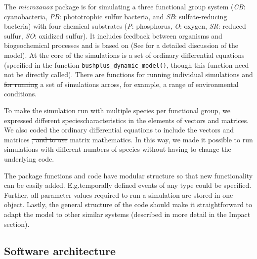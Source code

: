 \documentclass[]{elsarticle} %
\providecommand{\DIFaddtex}[1]{{\protect\color{blue}\uwave{#1}}} %
\providecommand{\DIFdeltex}[1]{{\protect\color{red}\sout{#1}}}                      %
\providecommand{\DIFaddbegin}{} %
\providecommand{\DIFaddend}{} %
\providecommand{\DIFdelbegin}{} %
\providecommand{\DIFdelend}{} %
\providecommand{\DIFadd}[1]{\texorpdfstring{\DIFaddtex{#1}}{#1}} %
\providecommand{\DIFdel}[1]{\texorpdfstring{\DIFdeltex{#1}}{}} %
\newcommand{\DIFscaledelfig}{0.5}
\newlength{\DIFdelgraphicswidth} %
\newlength{\DIFdelgraphicsheight} %
\newcommand{\DIFaddincludegraphics}[2][]{{\color{blue}\fbox{\DIFOincludegraphics[#1]{#2}}}} %
\newcommand{\DIFdelincludegraphics}[2][]{%
\sbox{\DIFdelgraphicsbox}{\DIFOincludegraphics[#1]{#2}}%
\settoboxwidth{\DIFdelgraphicswidth}{\DIFdelgraphicsbox} %
\settoboxtotalheight{\DIFdelgraphicsheight}{\DIFdelgraphicsbox} %
\scalebox{\DIFscaledelfig}{%
\parbox[b]{\DIFdelgraphicswidth}{\usebox{\DIFdelgraphicsbox}\\[-\baselineskip] \rule{\DIFdelgraphicswidth}{0em}}\llap{\resizebox{\DIFdelgraphicswidth}{\DIFdelgraphicsheight}{%
\setlength{\unitlength}{\DIFdelgraphicswidth}%
\begin{picture}(1,1)%
\thicklines\linethickness{2pt} %
{\color[rgb]{1,0,0}\put(0,0){\framebox(1,1){}}}%
{\color[rgb]{1,0,0}\put(0,0){\line( 1,1){1}}}%
{\color[rgb]{1,0,0}\put(0,1){\line(1,-1){1}}}%
\end{picture}%
}\hspace*{3pt}}} %
} %
\DeclareRobustCommand{\DIFaddbegin}{\DIFOaddbegin \let\includegraphics\DIFaddincludegraphics} %
\DeclareRobustCommand{\DIFaddend}{\DIFOaddend \let\includegraphics\DIFOincludegraphics} %
\DeclareRobustCommand{\DIFdelbegin}{\DIFOdelbegin \let\includegraphics\DIFdelincludegraphics} %
\DeclareRobustCommand{\DIFdelend}{\DIFOaddend \let\includegraphics\DIFOincludegraphics} %
\begin{document}
The \emph{microxanox} package is for simulating a three functional group system (\emph{CB}: cyanobacteria, \emph{PB}: phototrophic sulfur bacteria, and \emph{SB}: sulfate-reducing bacteria) with four chemical substrates (\emph{P}: phosphorus, \emph{O}: oxygen, \emph{SR}: reduced sulfur, \emph{SO}: oxidized sulfur). It includes feedback between organisms and biogeochemical processes and is based on \citet{Bush2017} (See \citet{Bush2017} for a detailed discussion of the model). At the core of the simulations is a set of ordinary differential equations (specified in the function \texttt{bushplus\_dynamic\_model()}, though this function need not be directly called). There are functions for running individual simulations and \DIFdelbegin \DIFdel{for running }\DIFdelend a set of simulations across, for example, a range of environmental conditions.

To make the simulation run with multiple species per functional group, we expressed different species\DIFaddbegin \DIFadd{' }\DIFaddend characteristics in the elements of vectors and matrices. We also coded the ordinary differential equations to include the vectors and matrices \DIFdelbegin \DIFdel{, and to use }\DIFdelend \DIFaddbegin \DIFadd{and used }\DIFaddend matrix mathematics. In this way, we made it possible to run simulations with different numbers of species without having to change the underlying code.

The package functions and code have \DIFaddbegin \DIFadd{a }\DIFaddend modular structure so that new functionality can be easily added. E.g.\DIFaddbegin \DIFadd{, }\DIFaddend temporally defined events of any type could be specified. Further, all parameter values required to run a simulation are stored in one object. Lastly, the general structure of the code should make it straightforward to adapt the model to other similar systems (described in more detail in the Impact section).

\hypertarget{software-architecture}{%
\subsection{Software architecture}\label{software-architecture}}
\end{document}
